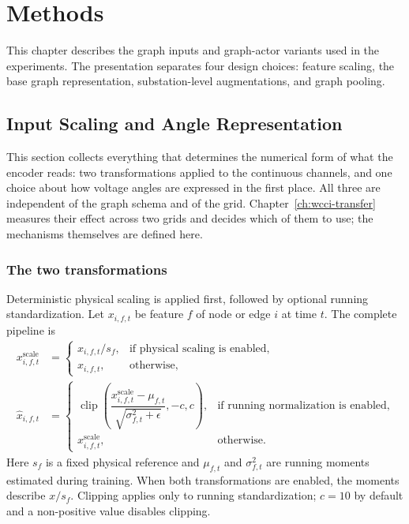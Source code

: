 \chapter{Methods}
\label{ch:methods}


This chapter describes the graph inputs and graph-actor variants used in the
experiments. The presentation separates four design choices: feature scaling,
the base graph representation, substation-level augmentations, and graph
pooling.

\section{Input Scaling and Angle Representation}
\label{subsec:graph-feature-normalization}

This section collects everything that determines the numerical form of what the
encoder reads: two transformations applied to the continuous channels, and one
choice about how voltage angles are expressed in the first place. All three are
independent of the graph schema and of the grid.
Chapter~\ref{ch:wcci-transfer} measures their effect across two grids and
decides which of them to use; the mechanisms themselves are defined here.

\subsection{The two transformations}

Deterministic physical scaling is applied first, followed by optional running
standardization. Let $x_{i,f,t}$ be feature $f$ of node or edge
$i$ at time $t$. The complete pipeline is
\begin{align}
  x^{\mathrm{scale}}_{i,f,t}
  &=
  \begin{cases}
    x_{i,f,t}/s_f, & \text{if physical scaling is enabled},\\
    x_{i,f,t}, & \text{otherwise},
  \end{cases}
  \label{eq:graph-physical-scaling}\\
  \widehat{x}_{i,f,t}
  &=
  \begin{cases}
    \operatorname{clip}\!\left(
      \dfrac{x^{\mathrm{scale}}_{i,f,t}-\mu_{f,t}}
            {\sqrt{\sigma_{f,t}^{2}+\epsilon}},
      -c,c
    \right), & \text{if running normalization is enabled},\\
    x^{\mathrm{scale}}_{i,f,t}, & \text{otherwise}.
  \end{cases}
  \label{eq:graph-feature-normalization}
\end{align}
Here $s_f$ is a fixed physical reference and $\mu_{f,t}$ and
$\sigma_{f,t}^{2}$ are running moments estimated during training. When both
transformations are enabled, the moments describe $x/s_f$. Clipping applies
only to running standardization; $c=10$ by default and a non-positive value
disables clipping.

